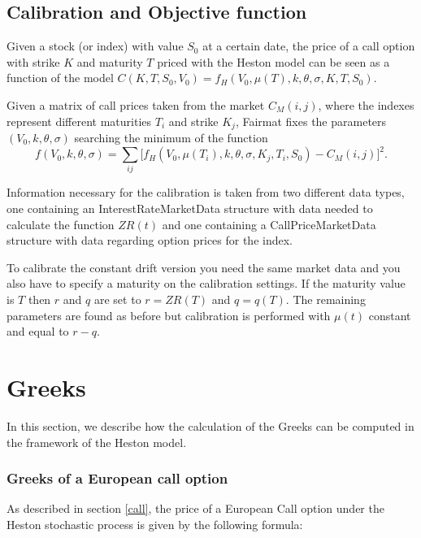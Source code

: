\subsection{Calibration and Objective function}

Given a stock (or index) with value $S_0$ at a certain date, the price of a call option with strike $K$ and maturity $T$ priced with the Heston model can be seen as a function of the model $C(K,T,S_0, V_0) = f_H(V_0, \mu(T), k, \theta, \sigma, K, T, S_0)$.

Given a matrix of call prices taken from the market $C_M(i,j)$, where the indexes represent different maturities $T_i$ and strike $K_j$, Fairmat fixes the parameters $(V_0, k, \theta, \sigma)$ searching the minimum of the function
\begin{equation}
f(V_0, k, \theta, \sigma) = \sum_{ij}\Big[f_H(V_0, \mu(T_i), k, \theta, \sigma, K_j, T_i, S_0) - C_M(i,j)\Big]^2.
\end{equation}

Information necessary for the calibration is taken from two different data types, one containing an InterestRateMarketData  structure with data needed to calculate the function $ZR(t)$ and one containing a CallPriceMarketData structure with data regarding option prices for the index.

To calibrate the constant drift version you need the same market data and you also have to specify a maturity on the calibration settings. If the maturity value is $T$ then $r$ and $q$ are set to $r = ZR(T)$ and $q = q(T)$. The remaining parameters are found as before but calibration is performed with $\mu(t)$ constant and equal to $r-q$.




\section{Greeks}
In this section, we describe how the calculation of the Greeks can be computed in the framework of the Heston model. 


\subsubsection{Greeks of a European call option}
As described in section \ref{call}, the price of a European Call option under the Heston stochastic process is given by the following formula:

